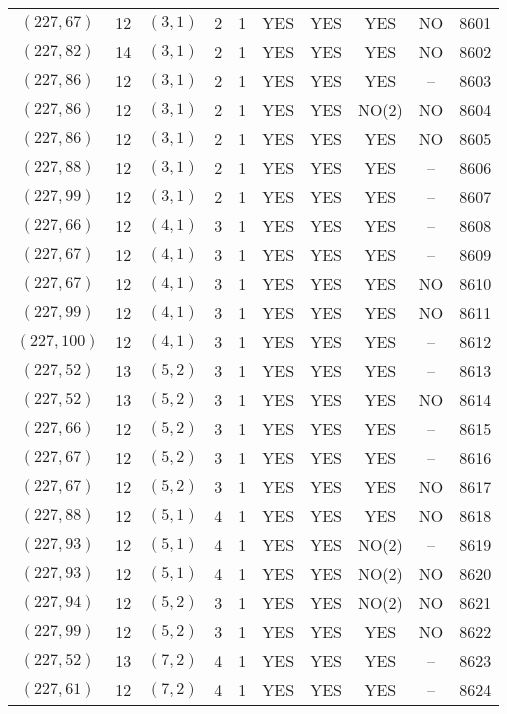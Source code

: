 \begin{longtable}{|c|c|c|c|c|c|c|c|c|c|}
$(227, 67)$ & 12 & $(3, 1)$ & 2 & 1 & YES & YES & YES & NO & 8601\\
$(227, 82)$ & 14 & $(3, 1)$ & 2 & 1 & YES & YES & YES & NO & 8602\\
$(227, 86)$ & 12 & $(3, 1)$ & 2 & 1 & YES & YES & YES & -- & 8603\\
$(227, 86)$ & 12 & $(3, 1)$ & 2 & 1 & YES & YES & NO(2) & NO & 8604\\
$(227, 86)$ & 12 & $(3, 1)$ & 2 & 1 & YES & YES & YES & NO & 8605\\
$(227, 88)$ & 12 & $(3, 1)$ & 2 & 1 & YES & YES & YES & -- & 8606\\
$(227, 99)$ & 12 & $(3, 1)$ & 2 & 1 & YES & YES & YES & -- & 8607\\
$(227, 66)$ & 12 & $(4, 1)$ & 3 & 1 & YES & YES & YES & -- & 8608\\
$(227, 67)$ & 12 & $(4, 1)$ & 3 & 1 & YES & YES & YES & -- & 8609\\
$(227, 67)$ & 12 & $(4, 1)$ & 3 & 1 & YES & YES & YES & NO & 8610\\
$(227, 99)$ & 12 & $(4, 1)$ & 3 & 1 & YES & YES & YES & NO & 8611\\
$(227, 100)$ & 12 & $(4, 1)$ & 3 & 1 & YES & YES & YES & -- & 8612\\
$(227, 52)$ & 13 & $(5, 2)$ & 3 & 1 & YES & YES & YES & -- & 8613\\
$(227, 52)$ & 13 & $(5, 2)$ & 3 & 1 & YES & YES & YES & NO & 8614\\
$(227, 66)$ & 12 & $(5, 2)$ & 3 & 1 & YES & YES & YES & -- & 8615\\
$(227, 67)$ & 12 & $(5, 2)$ & 3 & 1 & YES & YES & YES & -- & 8616\\
$(227, 67)$ & 12 & $(5, 2)$ & 3 & 1 & YES & YES & YES & NO & 8617\\
$(227, 88)$ & 12 & $(5, 1)$ & 4 & 1 & YES & YES & YES & NO & 8618\\
$(227, 93)$ & 12 & $(5, 1)$ & 4 & 1 & YES & YES & NO(2) & -- & 8619\\
$(227, 93)$ & 12 & $(5, 1)$ & 4 & 1 & YES & YES & NO(2) & NO & 8620\\
$(227, 94)$ & 12 & $(5, 2)$ & 3 & 1 & YES & YES & NO(2) & NO & 8621\\
$(227, 99)$ & 12 & $(5, 2)$ & 3 & 1 & YES & YES & YES & NO & 8622\\
$(227, 52)$ & 13 & $(7, 2)$ & 4 & 1 & YES & YES & YES & -- & 8623\\
$(227, 61)$ & 12 & $(7, 2)$ & 4 & 1 & YES & YES & YES & -- & 8624\\

\end{longtable}
